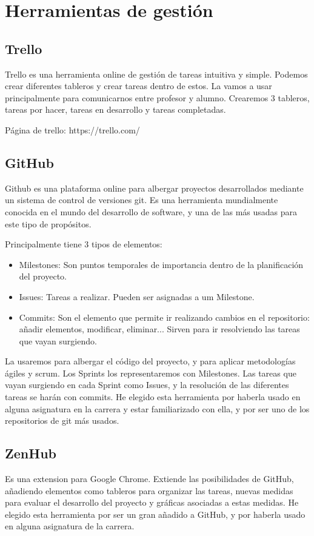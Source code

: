 \section{Herramientas de gestión}

\subsection{Trello}
Trello es una herramienta online de gestión de tareas intuitiva y simple. Podemos crear diferentes tableros y crear tareas dentro de estos. La vamos a usar principalmente para comunicarnos entre profesor y alumno. Crearemos 3 tableros, tareas por hacer, tareas en desarrollo y tareas completadas.

Página de trello: https://trello.com/

\subsection{GitHub}
Github es una plataforma online para albergar proyectos desarrollados mediante un sistema de control de versiones git. 
Es una herramienta mundialmente conocida en el mundo del desarrollo de software, y una de las más usadas para este tipo de propósitos.

Principalmente tiene 3 tipos de elementos:
\begin{itemize}
	\item Milestones: Son puntos temporales de importancia dentro de la planificación del proyecto.
	\item Issues: Tareas a realizar. Pueden ser asignadas a um Milestone. 
 	\item Commits: Son el elemento que permite ir realizando cambios en el repositorio: añadir elementos, modificar, eliminar... Sirven para ir resolviendo las tareas que vayan surgiendo.
\end{itemize}

La usaremos para albergar el código del proyecto, y para aplicar metodologías ágiles y scrum. Los Sprints los representaremos con Milestones. Las tareas que vayan surgiendo en cada Sprint como Issues, y la resolución de las diferentes tareas se harán con commits. He elegido esta herramienta por haberla usado en alguna asignatura en la carrera y estar familiarizado con ella, y por ser uno de los repositorios de git más usados.

\subsection{ZenHub}
Es una extension para Google Chrome. Extiende las posibilidades de GitHub, añadiendo elementos como tableros para organizar las tareas, nuevas medidas para evaluar el desarrollo del proyecto y gráficas asociadas a estas medidas. He elegido esta herramienta por ser un gran añadido a GitHub, y por haberla usado en alguna asignatura de la carrera.


